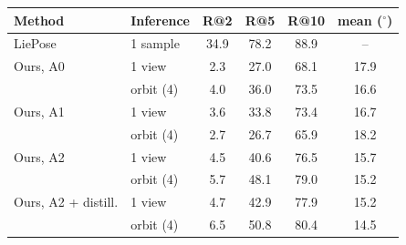 \begin{tabular}{@{}l l cccc@{}}
\toprule
Method & Inference & R@2 & R@5 & R@10 & mean ($^\circ$) \\
\midrule
LiePose~\cite{hsiao2024liepose} & 1 sample & 34.9 & 78.2 & 88.9 & -- \\
\midrule
Ours, A0 & 1 view & 2.3 & 27.0 & 68.1 & 17.9 \\
 & orbit (4) & 4.0 & 36.0 & 73.5 & 16.6 \\
Ours, A1 & 1 view & 3.6 & 33.8 & 73.4 & 16.7 \\
 & orbit (4) & 2.7 & 26.7 & 65.9 & 18.2 \\
Ours, A2 & 1 view & 4.5 & 40.6 & 76.5 & 15.7 \\
 & orbit (4) & 5.7 & 48.1 & 79.0 & 15.2 \\
Ours, A2 + distill. & 1 view & 4.7 & 42.9 & 77.9 & 15.2 \\
 & orbit (4) & 6.5 & 50.8 & 80.4 & 14.5 \\
\bottomrule
\end{tabular}